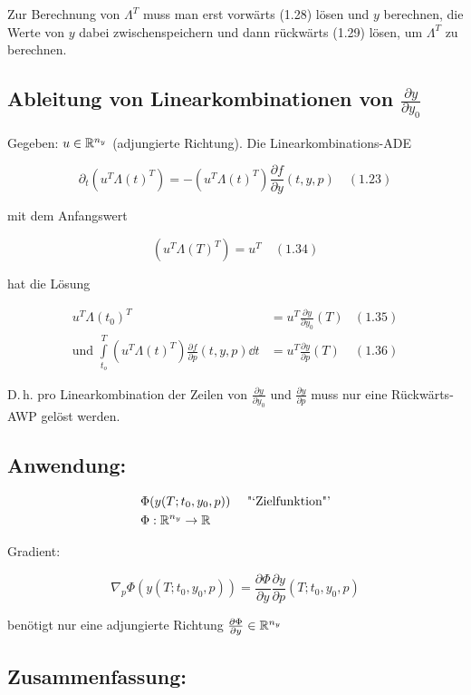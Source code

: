 Zur Berechnung von $\Lambda^T$ muss man erst vorwärts (1.28) lösen und $y$ berechnen, die Werte von $y$ dabei zwischenspeichern und dann rückwärts (1.29) lösen, um $\Lambda^T$ zu berechnen.

\subsection*{Ableitung von Linearkombinationen von $\frac{\partial y}{\partial y_0}$}

Gegeben: $u\in\mathbb{R}^{n_y}$ (adjungierte Richtung). Die Linearkombinations-ADE

\[ \partial_t (u^T \Lambda(t)^T) = - (u^T \Lambda (t)^T) \frac{\partial f}{\partial y} (t,y,p) \quad (1.23) \]

mit dem Anfangswert

\[ (u^T \Lambda(T)^T) = u^T \quad (1.34) \]

hat die Lösung

\begin{align*}
u^T \Lambda(t_0)^T &= u^T \frac{\partial y}{\partial y_0} (T) & (1.35) \\
\text{und } \int\limits_{t_o}^T (u^T \Lambda(t)^T) \frac{\partial f}{\partial p} (t,y,p) \dd t &= u^T \frac{\partial y}{\partial p} (T) & (1.36)
\end{align*}

D.\,h. pro Linearkombination der Zeilen von $\tfrac{\partial y}{\partial y_0}$ und $\tfrac{\partial y}{\partial p}$ muss nur eine Rückwärts-AWP gelöst werden.

\subsection*{Anwendung:}

\begin{align*}
& \Phi(y(T; t_0, y_0, p)) & & \text{ "`Zielfunktion"'} \\
& \Phi: \mathbb{R}^{n_y}  \to \mathbb{R}
\end{align*}

Gradient:

\[ \nabla_p \Phi(y(T; t_0, y_0,p)) = \frac{\partial \Phi}{\partial y} \frac{\partial y}{\partial p} (T; t_0,y_0,p) \]

benötigt nur eine adjungierte Richtung $\tfrac{\partial \Phi}{\partial y} \in \mathbb{R}^{n_y}$

\subsection*{Zusammenfassung:}

